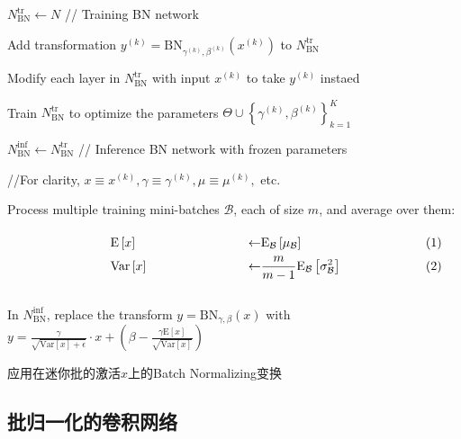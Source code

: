 \documentclass[../main.tex]{subfile}
\begin{document}
\begin{algorithm}[H]
    \DontPrintSemicolon
    $N_\text{BN}^\text{tr} \gets N$ // Training BN network

    {
    Add transformation $y^{\left(k\right)} = \text{BN}_{\gamma^{\left(k\right)},\beta^{\left(k\right)}}\left(x^{\left(k\right)}\right)$ to $N_\text{BN}^\text{tr}$

    Modify each layer in $N_\text{BN}^\text{tr}$ with input $x^{\left(k\right)}$ to take $y^{\left(k\right)}$ instaed
    }

    Train $N_\text{BN}^\text{tr}$ to optimize the parameters $\Theta \cup \left\{ \gamma^{\left(k\right)}, \beta^{\left(k\right)} \right\}_{k=1}^K$

    $N_\text{BN}^\text{inf} \gets N_\text{BN}^\text{tr}$ // Inference BN network with frozen parameters

    {
        //For clarity, $x \equiv x^{\left(k\right)}, \gamma \equiv \gamma^{\left(k\right)},\mu \equiv \mu^{\left(k\right)},$ etc.

        Process multiple training mini-batches $\mathcal{B}$, each of size $m$, and average over them: $\vcenter{
                \begin{align*}
                     & \text{E}\left[x\right]   & \gets & \text{E}_\mathcal{B} \left[ \mu_\mathcal{B} \right]                  \\
                     & \text{Var}\left[x\right] & \gets & \frac{m}{m-1}\text{E}_\mathcal{B}\left[ \sigma_\mathcal{B}^2 \right]
                \end{align*}
            }$
    }

    In $N_\text{BN}^\text{inf}$, replace the transform $y = \text{BN}_{\gamma, \beta}\left(x\right)$ with \\$y = \frac{\gamma}{\sqrt{\text{Var}\left[x\right] + \epsilon}}\cdot x + \left( \beta - \frac{\gamma\text{E}\left[x\right] }{\sqrt{\text{Var}\left[x\right]}} \right)$
    \caption{应用在迷你批的激活$x$上的Batch Normalizing变换}
    \label{alg2}
\end{algorithm}

\subsection{批归一化的卷积网络}
\end{document}

